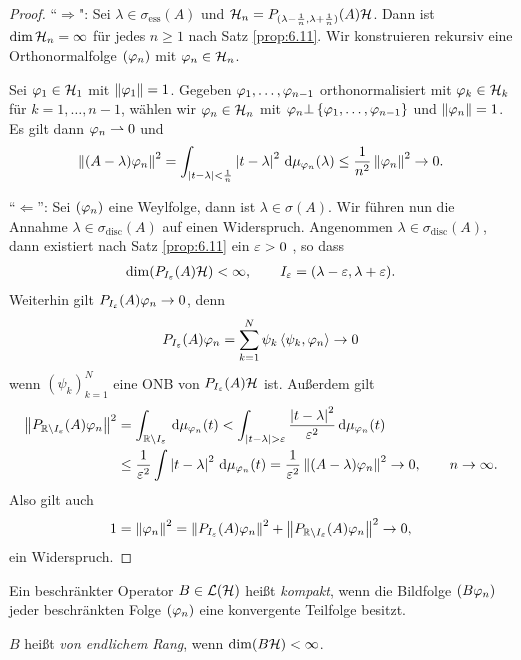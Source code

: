 \begin{proof}
``$\Rightarrow$": Sei $\lambda\in\sigma_\mathrm{ess}(A)$ und $\mathcal{H}_n =
P_{(\lambda-\frac{1}{n},\lambda+\frac{1}{n})}(A)\mathcal{H}$.
Dann ist $\dim\mathcal{H}_n = \infty$ für jedes $n\ge 1$ nach Satz \ref{prop:6.11}. Wir
konstruieren rekursiv eine Orthonormalfolge $(\varphi_n)$ mit $\varphi_n\in\mathcal{H}_n$.

Sei $\varphi_1\in \mathcal{H}_1$ mit $\left\|\varphi_1\right\|=1$. Gegeben $\varphi_1,\ldots,\varphi_{n-1}$
orthonormalisiert mit $\varphi_k\in\mathcal{H}_k$ für $k=1,\ldots,n-1$, wählen wir
$\varphi_n\in\mathcal{H}_n$ mit $\varphi_n\bot \left\{ \varphi_1,\ldots,\varphi_{n-1} \right\}$ und
$\left\|\varphi_n\right\|=1$. Es gilt dann $\varphi_n\rightharpoonup 0$ und
\begin{align*}
\left\|(A-\lambda)\varphi_n\right\|^2 = 
\int_{\left|t-\lambda\right|<\frac{1}{n}} \left|t-\lambda\right|^2 \,\mathrm{d} \mu_{\varphi_n}(\lambda)
\le \frac{1}{n^2}\left\|\varphi_n\right\|^2 \to 0.
\end{align*}

``$\Leftarrow$'': Sei $(\varphi_n)$ eine Weylfolge, dann ist $\lambda\in\sigma(A)$.
Wir führen nun die Annahme $\lambda\in\sigma_\mathrm{disc}(A)$ auf einen
Widerspruch. Angenommen $\lambda\in\sigma_\mathrm{disc}(A)$, dann existiert nach
Satz \ref{prop:6.11} ein $\varepsilon > 0$ , so dass
\begin{align*}
\dim(P_{I_\varepsilon}(A)\mathcal{H}) < \infty,\qquad I_\varepsilon = (\lambda-\varepsilon,\lambda+\varepsilon).  
\end{align*}
Weiterhin gilt $P_{I_\varepsilon}(A) \varphi_n \to 0$, denn
\begin{align*}
P_{I_\varepsilon}(A)\varphi_n = \sum_{k=1}^N \psi_k\left\langle\psi_k,\varphi_n\right\rangle\to 0
\end{align*}
wenn $(\psi_k)_{k=1}^N$ eine ONB von $P_{I_\varepsilon}(A)\mathcal{H}$ ist. Außerdem gilt
\begin{align*}
\norm{P_{\R\setminus I_\ep}(A)\ph_n}^2 &=
\int_{\R\setminus I_\ep} \dmu_{\ph_n}(t)
<
\int_{\abs{t-\lambda}>\ep} \frac{\abs{t-\lambda}^2}{\ep^2} \dmu_{\ph_n}(t)\\
&\le
\frac{1}{\ep^2} \int \abs{t-\lambda}^2 \dmu_{\ph_n}(t)
= \frac{1}{\ep^2} \norm{(A-\lambda)\ph_n}^2 \to 0,\qquad n\to \infty.
\end{align*}
Also gilt auch
\begin{align*}
1 = \left\|\varphi_n\right\|^2 = \left\|P_{I_\varepsilon}(A)\varphi_n\right\|^2 + \left\|P_{\mathbb{R}\setminus
I_\varepsilon}(A)\varphi_n\right\|^2 \to 0,
\end{align*}
ein Widerspruch.\qedhere
\end{proof}

\begin{defn*}
Ein beschränkter Operator $B\in\mathcal{L}(\mathcal{H})$ heißt
\emph{kompakt}, wenn die Bildfolge $(B\varphi_n)$ jeder
beschränkten Folge $(\varphi_n)$ eine konvergente Teilfolge besitzt.

$B$ heißt \emph{von endlichem Rang}, wenn
$\dim (B\mathcal{H}) < \infty$.\fishhere
\end{defn*}

